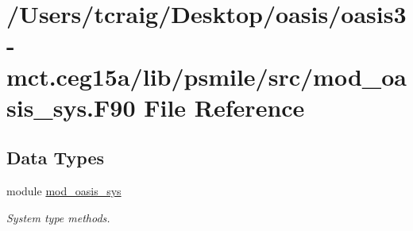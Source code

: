 \hypertarget{mod__oasis__sys_8_f90}{\section{/\+Users/tcraig/\+Desktop/oasis/oasis3-\/mct.ceg15a/lib/psmile/src/mod\+\_\+oasis\+\_\+sys.F90 File Reference}
\label{mod__oasis__sys_8_f90}
}
\subsection*{Data Types}
\begin{DoxyCompactItemize}
\item 
module \hyperlink{classmod__oasis__sys}{mod\+\_\+oasis\+\_\+sys}
\begin{DoxyCompactList}\small\item\em System type methods. \end{DoxyCompactList}\end{DoxyCompactItemize}
